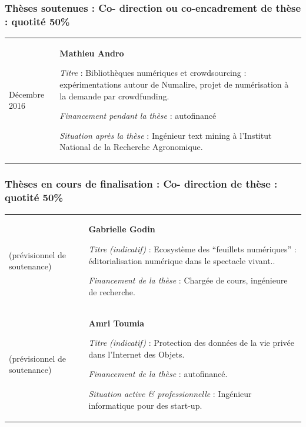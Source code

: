 \documentclass[
  a4paper,
  DIV=11,
  numbers=noendperiod]{scrreprt}
\begin{document}
\subsubsection*{Thèses soutenues : Co- direction ou co-encadrement de
thèse : quotité
50\%}\label{thuxe8ses-soutenues-co--direction-ou-co-encadrement-de-thuxe8se-quotituxe9-50}

\begin{longtable}[]{@{}
  >{\raggedright\arraybackslash}p{}
  >{\raggedright\arraybackslash}p{}@{}}
\toprule\noalign{}
\endhead
\bottomrule\noalign{}
\endlastfoot
Décembre 2016 & \textbf{Mathieu Andro}

\emph{Titre} : Bibliothèques numériques et crowdsourcing :
expérimentations autour de Numalire, projet de numérisation à la demande
par crowdfunding.

\emph{Financement pendant la thèse} : autofinancé

\emph{Situation après la thèse} : Ingénieur text mining à l'Institut
National de la Recherche Agronomique. \\
\end{longtable}

\subsubsection*{Thèses en cours de finalisation : Co- direction de thèse
: quotité
50\%}\label{thuxe8ses-en-cours-de-finalisation-co--direction-de-thuxe8se-quotituxe9-50}

\begin{longtable}[]{@{}
  >{\raggedright\arraybackslash}p{}
  >{\raggedright\arraybackslash}p{}@{}}
\toprule\noalign{}
\endhead
\bottomrule\noalign{}
\endlastfoot
2018

(prévisionnel de soutenance) & \textbf{Gabrielle Godin}

\emph{Titre (indicatif)} : Ecosystème des ``feuillets numériques'' :
éditorialisation numérique dans le spectacle vivant..

\emph{Financement de la thèse} : Chargée de cours, ingénieure de
recherche. \\
2017

(prévisionnel de soutenance) & \textbf{Amri Toumia}

\emph{Titre (indicatif)} : Protection des données de la vie privée dans
l'Internet des Objets.

\emph{Financement de la thèse} : autofinancé.

\emph{Situation active \& professionnelle} : Ingénieur informatique pour
des start-up. \\
\end{longtable}
\end{document}
